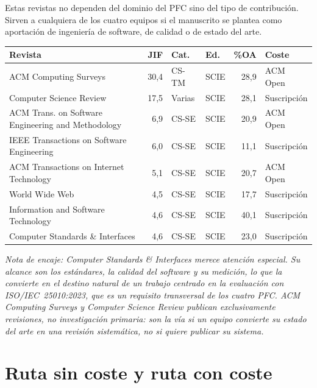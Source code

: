 \documentclass[11pt,a4paper]{article}
\newcommand{\jcrnote}[1]{{\footnotesize\itshape #1}}
\begin{document}
Estas revistas no dependen del dominio del PFC sino del tipo de contribución. Sirven a cualquiera de los cuatro equipos si el manuscrito se plantea como aportación de ingeniería de software, de calidad o de estado del arte.

\begin{center}
	\footnotesize
	\begin{longtable}{@{}p{6.2cm}rp{1.2cm}p{1.3cm}rp{3.4cm}@{}}
		\toprule
		\textbf{Revista} & \textbf{JIF} & \textbf{Cat.} & \textbf{Ed.} & \textbf{\%OA} & \textbf{Coste} \\
		\midrule
		\endhead
		ACM Computing Surveys & 30,4 & CS-TM & SCIE & 28,9 & ACM Open \\
		Computer Science Review & 17,5 & Varias & SCIE & 28,1 & Suscripción \\
		ACM Trans. on Software Engineering and Methodology & 6,9 & CS-SE & SCIE & 20,9 & ACM Open \\
		IEEE Transactions on Software Engineering & 6,0 & CS-SE & SCIE & 11,1 & Suscripción \\
		ACM Transactions on Internet Technology & 5,1 & CS-SE & SCIE & 20,7 & ACM Open \\
		World Wide Web & 4,5 & CS-SE & SCIE & 17,7 & Suscripción \\
		Information and Software Technology & 4,6 & CS-SE & SCIE & 40,1 & Suscripción \\
		Computer Standards \& Interfaces & 4,6 & CS-SE & SCIE & 23,0 & Suscripción \\
		\bottomrule
	\end{longtable}
\end{center}

\jcrnote{Nota de encaje: \emph{Computer Standards \& Interfaces} merece atención especial. Su alcance son los estándares, la calidad del software y su medición, lo que la convierte en el destino natural de un trabajo centrado en la evaluación con \mbox{ISO/IEC 25010:2023}, que es un requisito transversal de los cuatro PFC. \emph{ACM Computing Surveys} y \emph{Computer Science Review} publican exclusivamente revisiones, no investigación primaria: son la vía si un equipo convierte su estado del arte en una revisión sistemática, no si quiere publicar su sistema.}

\newpage
\section{Ruta sin coste y ruta con coste}
\label{sec:costes}
\end{document}
